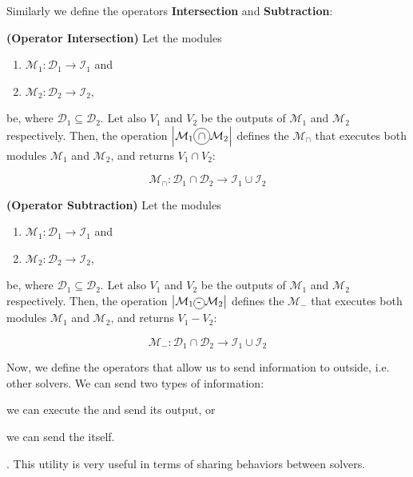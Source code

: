 Similarly we define the operators \textbf{Intersection} and \textbf{Subtraction}:

\begin{definition}\label{op:intersec}
{\bf (Operator Intersection)} Let the modules
\begin{enumerate}%
	\item $\mathcal{M}_1 : \mathcal{D}_1 \rightarrow \mathcal{I}_1$ and  
	\item $\mathcal{M}_2 : \mathcal{D}_2 \rightarrow \mathcal{I}_2$,
\end{enumerate}%
be, where $\mathcal{D}_1 \subseteq \mathcal{D}_2$. %
Let also $V_1$ and $V_2$ be the outputs of $\mathcal{M}_1$ and $\mathcal{M}_2$ respectively. Then, the operation $\left|\mathcal{M}_1\circled{$\cap$}\mathcal{M}_2\right|$ defines the \cm{} $\mathcal{M}_{\cap}$ that executes both modules $\mathcal{M}_1$ and $\mathcal{M}_2$, and returns $V_1\cap V_2$:

\[
\mathcal{M}_{\cap}:\mathcal{D}_1\cap\mathcal{D}_2 \rightarrow \mathcal{I}_1 \cup \mathcal{I}_2
\]
\end{definition}

\begin{definition}\label{op:subst}
{\bf (Operator Subtraction)} Let the modules
\begin{enumerate}%
	\item $\mathcal{M}_1 : \mathcal{D}_1 \rightarrow \mathcal{I}_1$ and  
	\item $\mathcal{M}_2 : \mathcal{D}_2 \rightarrow \mathcal{I}_2$,
\end{enumerate}%
be, where $\mathcal{D}_1 \subseteq \mathcal{D}_2$. %
Let also $V_1$ and $V_2$ be the outputs of $\mathcal{M}_1$ and $\mathcal{M}_2$ respectively. Then, the operation $\left|\mathcal{M}_1\circled{-}\mathcal{M}_2\right|$ defines the \cm{} $\mathcal{M}_{-}$ that executes both modules $\mathcal{M}_1$ and $\mathcal{M}_2$, and returns $V_1 - V_2$:

\[
\mathcal{M}_{-}:\mathcal{D}_1\cap\mathcal{D}_2 \rightarrow \mathcal{I}_1 \cup \mathcal{I}_2
\]
\end{definition}

Now, we define the operators that allow us to send information to outside, i.e. other solvers. We can send two types of information: 
\begin{inparaenum}[i)]
	\item we can execute the \om{} and send its output, or 
	\item we can send the \om{} itself.
\end{inparaenum}. This utility is very useful in terms of sharing behaviors between solvers.

